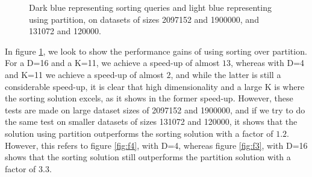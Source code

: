 \begin{figure}[H]
  \centering
  \caption{Dark blue representing sorting queries and light blue representing using partition, on datasets of sizes 2097152 and 1900000, and 131072 and 120000.}
\label{fig:sort1}
\end{figure}

In figure \ref{fig:sort1}, we look to show the performance gains of using sorting over partition. For a D=16 and a K=11, we achieve a speed-up of almost $13$, whereas with D=4 and K=11 we achieve a speed-up of almost $2$, and while the latter is still a considerable speed-up, it is clear that high dimensionality and a large K is where the sorting solution excels, as it shows in the former speed-up. However, these tests are made on large dataset sizes of 2097152 and 1900000, and if we try to do the same test on smaller datasets of sizes 131072 and 120000, it shows that the solution using partition outperforms the sorting solution with a factor of $1.2$. 
However, this refers to figure \ref{fig:f4}, with D=4, whereas figure \ref{fig:f3}, with D=16 shows that the sorting solution still outperforms the partition solution with a factor of $3.3$.


